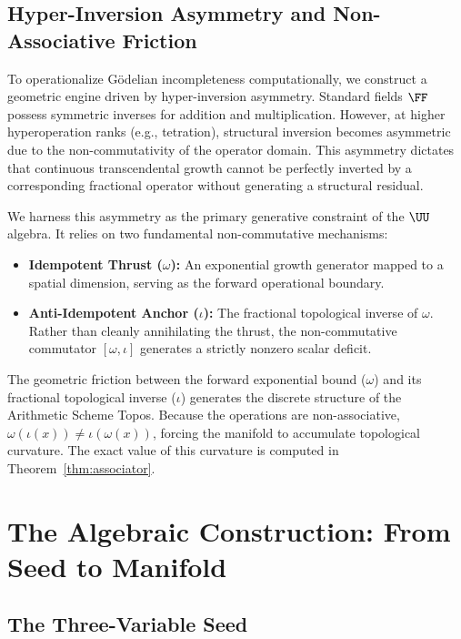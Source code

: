 \subsection{Hyper-Inversion Asymmetry and Non-Associative Friction}

To operationalize G\"odelian incompleteness computationally, we construct a geometric engine driven by hyper-inversion asymmetry. Standard fields $\FF$ possess symmetric inverses for addition and multiplication. However, at higher hyperoperation ranks (e.g., tetration), structural inversion becomes asymmetric due to the non-commutativity of the operator domain. This asymmetry dictates that continuous transcendental growth cannot be perfectly inverted by a corresponding fractional operator without generating a structural residual.

We harness this asymmetry as the primary generative constraint of the $\UU$ algebra. It relies on two fundamental non-commutative mechanisms:
\begin{itemize}
\item \textbf{Idempotent Thrust ($\omega$):} An exponential growth generator mapped to a spatial dimension, serving as the forward operational boundary.
\item \textbf{Anti-Idempotent Anchor ($\iota$):} The fractional topological inverse of $\omega$. Rather than cleanly annihilating the thrust, the non-commutative commutator $[\omega, \iota]$ generates a strictly nonzero scalar deficit.
\end{itemize}

The geometric friction between the forward exponential bound ($\omega$) and its fractional topological inverse ($\iota$) generates the discrete structure of the Arithmetic Scheme Topos. Because the operations are non-associative, $\omega(\iota(x)) \neq \iota(\omega(x))$, forcing the manifold to accumulate topological curvature. The exact value of this curvature is computed in Theorem~\ref{thm:associator}.

\section{The Algebraic Construction: From Seed to Manifold}

\subsection{The Three-Variable Seed}\label{sec:seed}

